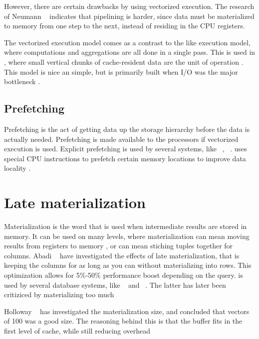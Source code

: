 However, there are certain drawbacks by using vectorized execution. The research of Neumann \ea~\cite{Neumann2011-uq} indicates that pipelining is harder, since data must be materialized to memory from one step to the next, instead of residing in the CPU registers.

The vectorized execution model comes as a contrast to the  like execution model, where computations and aggregations are all done in a single pass. This is used in \monetx, where small vertical chunks of cache-resident data are the unit of operation \cite{Boncz2005-wj}. This model is nice an simple, but is primarily built when I/O was the major bottleneck \cite{Neumann2011-uq}.

\subsection{Prefetching}
\label{sub:Prefetching}
Prefetching is the act of getting data up the storage hierarchy before the data is actually needed. Prefetching is made available to the processors if vectorized execution is used. Explicit prefetching is used by several systems, like \ibm~\cite{Raman2013-em}, \monetx~\cite{Boncz2005-wj}. \exasol uses special CPU instructions to prefetch certain memory locations to improve data locality \cite{Exasol2014-xh}.


\section{Late materialization}
\label{sec:Late materialization}
Materialization is the word that is used when intermediate results are stored in memory. It can be used on many levels, where materialization can mean moving results from registers to memory \cite{Neumann2011-uq}, or can mean stiching tuples together for columns. Abadi \ea~\cite{Abadi2008-dd} have investigated the effects of late materialization, that is keeping the columns for as long as you can without materializing into rows. This optimization allows for 5\%-50\% performance boost depending on the query.  is used by several database systems, like \ibm~\cite{Raman2013-em} and \monetdb~\cite{Boncz2002-yj}. The latter has later been critiziced by materializing too much \cite{Boncz2005-wj}

Holloway \ea~\cite{Holloway2008-rr} has investigated the materialization size, and concluded that vectors of 100 was a good size. The reasoning behind this is that the buffer fits in the first level of cache, while still reducing overhead

